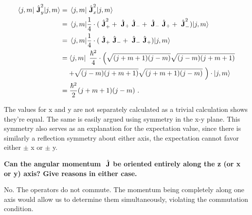 \begin{alphaparts}
\begin{align}
    \expectationvalue{\Angularmomentum_y ^2}{j, m} &= \expectationvalue{\Angularmomentum_x ^2}{j, m} \\
    &= \expectationvalue{\frac{1}{4} \cdot (\Angularmomentum_+ ^2 + \Angularmomentum_+ \Angularmomentum_-
            + \Angularmomentum_- \Angularmomentum_+ + \Angularmomentum_- ^2)}{j, m} \\
    &= \expectationvalue{\frac{1}{4} \cdot (\Angularmomentum_+ \Angularmomentum_-
            + \Angularmomentum_- \Angularmomentum_+)}{j, m} \\
    &= \bra{j, m}~\frac{\hbar ^2}{4} \cdot \left(\sqrt{(j + m + 1)(j - m)}\sqrt{(j - m)(j + m + 1)} \right.\nonumber \\
        &\quad\left. + \sqrt{(j - m)(j + m + 1)}\sqrt{(j + m + 1)(j - m)}~\right) \cdot \ket{j, m} \\
    &= \frac{\hbar ^ 2}{2}(j + m + 1)(j - m)~.
\end{align}

The values for x and y are not separately calculated as a trivial calculation shows they're equal. The 
same is easily argued using symmetry in the x-y plane. This symmetry also serves as an explanation for the
expectation value, since there is similarly a reflection symmetry about either axis, the expectation cannot
favor either $\pm$ x or $\pm$ y.

\questionpart \textbf{Can the angular momentum $~\hat{\textbf{J}}$ be oriented entirely along 
the z (or x or y) axis?  Give reasons in either case.}

No. The operators do not commute. The momentum being completely along one axis would allow
us to determine them simultaneously, violating the commutation condition.

\end{alphaparts}